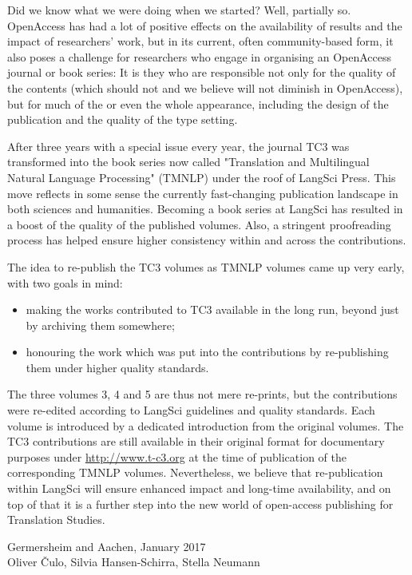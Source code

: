 Did we know what we were doing when we started? Well, partially so. OpenAccess has had a lot of positive effects on the availability of results and the impact of researchers' work, but in its current, often community-based form, it also poses a challenge for researchers who engage in organising an OpenAccess journal or book series: It is they who are responsible not only for the quality of the contents (which should not and we believe will not diminish in OpenAccess), but for much of the or even the whole appearance, including the design of the publication and the quality of the type setting.

After three years with a special issue every year, the journal TC3 was transformed into the book series now called "Translation and Multilingual Natural Language Processing" (TMNLP) under the roof of LangSci Press. This move reflects in some sense the currently fast-changing publication landscape in both sciences and humanities. Becoming a book series at LangSci has resulted in a boost of the quality of the published volumes. Also, a stringent proofreading process has helped ensure higher consistency within and across the contributions.

The idea to re-publish the TC3 volumes as TMNLP volumes came up very early, with two goals in mind:
\begin{itemize}
\item making the works contributed to TC3 available in the long run, beyond just by archiving them somewhere;
\item honouring the work which was put into the contributions by re-publishing them under higher quality standards.
\end{itemize}

The three volumes 3, 4 and 5 are thus not mere re-prints, but the contributions were re-edited according to LangSci guidelines and quality standards. Each volume is introduced by a dedicated introduction from the original volumes. The TC3 contributions are still available in their original format for documentary purposes under \url{http://www.t-c3.org} at the time of publication of the corresponding TMNLP volumes. Nevertheless, we believe that re-publication within LangSci will ensure enhanced impact and long-time availability, and on top of that it is a further step into the new world of open-access publishing for Translation Studies.

\bigskip
\hfill Germersheim and Aachen, January 2017 \\
\bigskip
\hfill Oliver Čulo, Silvia Hansen-Schirra, Stella Neumann

\printbibliography[heading=subbibliography,notkeyword=this]

